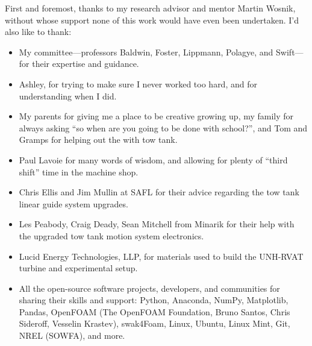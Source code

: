 



\begin{Acknowledgments}
\setlength{\baselineskip}{1.5\baselineskip}
{

    First and foremost, thanks to my research advisor and mentor Martin Wosnik,
    without whose support none of this work would have even been undertaken. I'd
    also like to thank:

    \begin{itemize}

        \item My committee---professors Baldwin, Foster, Lippmann, Polagye, and
        Swift---for their expertise and guidance.

        \item Ashley, for trying to make sure I never worked too hard, and for
        understanding when I did.

        \item My parents for giving me a place to be creative growing up, my
        family for always asking ``so when are you going to be done with
        school?'', and Tom and Gramps for helping out the with tow tank.

        \item Paul Lavoie for many words of wisdom, and allowing for plenty of
        ``third shift'' time in the machine shop.

        \item Chris Ellis and Jim Mullin at SAFL for their advice regarding the
        tow tank linear guide system upgrades.

        \item Les Peabody, Craig Deady, Sean Mitchell from Minarik for their
        help with the upgraded tow tank motion system electronics.

        \item Lucid Energy Technologies, LLP, for materials used to build the
        UNH-RVAT turbine and experimental setup.

        \item All the open-source software projects, developers, and communities
        for sharing their skills and support: Python, Anaconda, NumPy,
        Matplotlib, Pandas, OpenFOAM (The OpenFOAM Foundation, Bruno Santos,
        Chris Sideroff, Vesselin Krastev), swak4Foam, Linux, Ubuntu, Linux Mint,
        Git, NREL (SOWFA), and more.


\end{itemize}}
\end{Acknowledgments}
